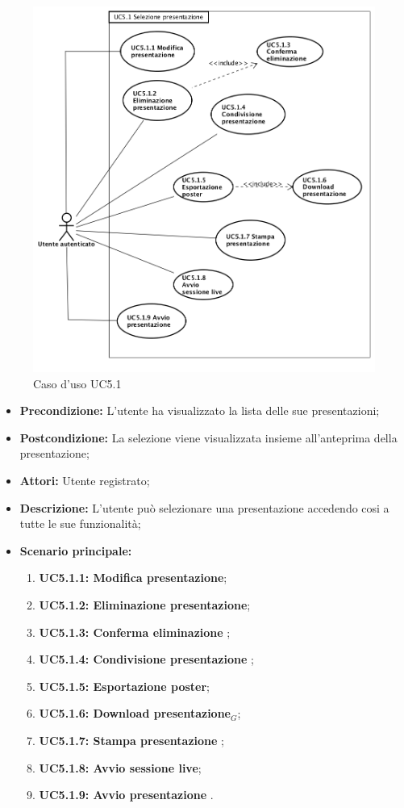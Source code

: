 \begin{figure}[h]
	\begin{center}
	\includegraphics[scale=0.4]{diagram/UC5-1.png}
	\caption{Caso d'uso UC5.1}
	\end{center}
\end{figure}
\begin{itemize}
	\item \textbf{Precondizione:} L'utente ha visualizzato la lista delle sue presentazioni;
	\item \textbf{Postcondizione:} La selezione viene visualizzata insieme all'anteprima della presentazione;
	\item \textbf{Attori:} Utente registrato;
	\item \textbf{Descrizione:} L'utente può selezionare una presentazione accedendo cosi a tutte le sue funzionalità;
	\item \textbf{Scenario principale:}
	\begin{enumerate}
		\item \textbf{ UC5.1.1: Modifica presentazione};
		\item \textbf{ UC5.1.2: Eliminazione presentazione};
		\item \textbf{ UC5.1.3: Conferma eliminazione };
		\item \textbf{ UC5.1.4: Condivisione presentazione };
		\item \textbf{ UC5.1.5: Esportazione poster};
		\item \textbf{ UC5.1.6: Download presentazione$_G$};
		\item \textbf{ UC5.1.7: Stampa presentazione };
		\item \textbf{ UC5.1.8: Avvio sessione live};
		\item \textbf{ UC5.1.9: Avvio presentazione }.
	\end{enumerate}
\end{itemize}
